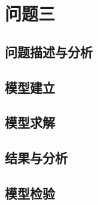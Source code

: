\section{问题三}
\subsection{问题描述与分析}
\subsection{模型建立}
\subsection{模型求解}
\subsection{结果与分析}
\subsection{模型检验}
